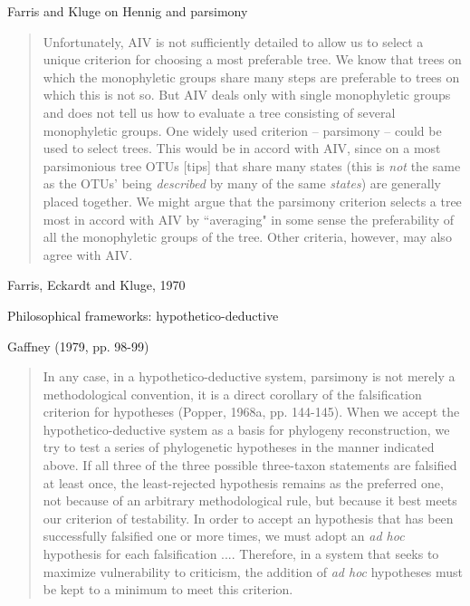 \documentclass[bluish,slideColor,colorBG,pdf]{prosper}
\begin{document}
\begin{slide}[Replace]{Farris and Kluge on Hennig and parsimony}

\begin{quote}
Unfortunately, AIV is not sufficiently detailed to allow us to select a
unique criterion for choosing a most preferable tree.  We know that trees on
which the monophyletic groups share many steps are preferable to trees on
which this is not so.  But AIV deals only with single monophyletic groups 
and does not tell us how to evaluate a tree consisting of several
monophyletic groups.  One widely used criterion -- parsimony -- could be used
to select trees.  This would be in accord with AIV, since on a most
parsimonious tree OTUs [tips] that share many states (this is {\it not} the
same as the OTUs' being {\it described} by many of the same {\it states})
are generally placed together.  We might argue that the parsimony criterion
selects a tree most in accord with AIV by ``averaging" in some sense the
preferability of all the monophyletic groups of the tree.  Other criteria,
however, may also agree with AIV.
\end{quote}

\begin{flushright}
Farris, Eckardt and Kluge, 1970
\end{flushright}

\end{slide}

\begin{slide}[Replace]{Philosophical frameworks: hypothetico-deductive}

Gaffney (1979, pp. 98-99)
\begin{quote}
In any case, in a hypothetico-deductive system, parsimony is not merely a
methodological convention, it is a direct corollary of the falsification
criterion for hypotheses (Popper, 1968a, pp. 144-145).  When we accept the
hypothetico-deductive system as a basis for phylogeny reconstruction, we
try to test a series of phylogenetic hypotheses in the manner indicated
above.  If all three of the three possible three-taxon statements are falsified at
least once, the least-rejected hypothesis remains as the preferred one,
not because of an arbitrary methodological rule, but because it best meets our
criterion of testability.  In order to accept an hypothesis that has been
successfully falsified one or more times, we must adopt an {\it ad hoc}
hypothesis for each falsification .... Therefore, in a system that seeks
to maximize vulnerability to criticism, the addition of {\it ad hoc}
hypotheses must be kept to a minimum to meet this criterion.
\end{quote}

\end{slide}
\end{document}
